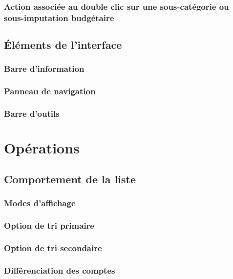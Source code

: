 \subsubsection{Action associée au double clic sur une sous-catégorie ou sous-imputation budgétaire\label{setup-display-third-mouse}}


\subsection{Éléments de l'interface\label{setup-display-toolbars}}


\subsubsection{Barre d'information}

\subsubsection{Panneau de navigation}

\subsubsection{Barre d'outils}

\section{Opérations\label{setup-operations}}


\subsection{Comportement de la liste\label{setup-operations-list}}


\subsubsection{Modes d'affichage\label{setup-operations-list-modes}}


\subsubsection{Option de tri primaire}

\subsubsection{Option de tri secondaire}

\subsubsection{Différenciation des comptes\label{setup-operations-list-differenciation}}

